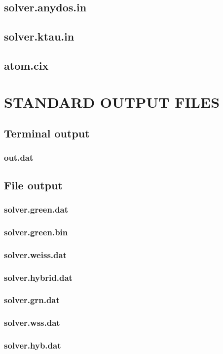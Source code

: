 \documentclass[10pt]{book}
\begin{document}
\section{solver.anydos.in}
\section{solver.ktau.in}
\section{atom.cix}

\chapter{STANDARD OUTPUT FILES}
\section{Terminal output}
\subsection{out.dat}
\section{File output}
\subsection{solver.green.dat}
\subsection{solver.green.bin}
\subsection{solver.weiss.dat}
\subsection{solver.hybrid.dat}
\subsection{solver.grn.dat}
\subsection{solver.wss.dat}
\subsection{solver.hyb.dat}
\end{document}
